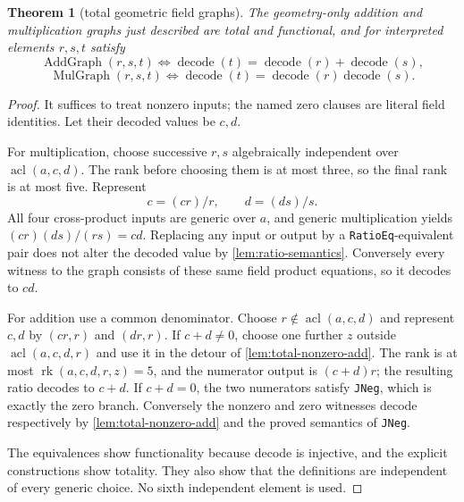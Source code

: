 \documentclass[11pt,oneside]{article}
\newtheorem{theorem}{Theorem}[section]
\theoremstyle{definition}
\theoremstyle{remark}
\newcommand{\acl}{\operatorname{acl}}
\newcommand{\rk}{\operatorname{rk}}
\newcommand{\lean}[1]{\nolinkurl{#1}}
\begin{document}
\begin{theorem}[total geometric field graphs]\label{thm:total-field-graphs}
The geometry-only addition and multiplication graphs just described are total and
functional, and for interpreted elements $r,s,t$ satisfy
\[
 \operatorname{AddGraph}(r,s,t)\Longleftrightarrow
   \operatorname{decode}(t)=\operatorname{decode}(r)+\operatorname{decode}(s),
\]
\[
 \operatorname{MulGraph}(r,s,t)\Longleftrightarrow
   \operatorname{decode}(t)=\operatorname{decode}(r)\operatorname{decode}(s).
\]
\end{theorem}
\begin{proof}
It suffices to treat nonzero inputs; the named zero clauses are literal field identities.
Let their decoded values be $c,d$.

For multiplication, choose successive $r,s$ algebraically independent over
$\acl(a,c,d)$.  The rank before choosing them is at most three, so the final rank is at
most five.  Represent
\[
 c=(cr)/r,\qquad d=(ds)/s.
\]
All four cross-product inputs are generic over $a$, and generic multiplication yields
$(cr)(ds)/(rs)=cd$.  Replacing any input or output by a \lean{RatioEq}-equivalent pair
does not alter the decoded value by \cref{lem:ratio-semantics}.  Conversely every witness
to the graph consists of these same field product equations, so it decodes to $cd$.

For addition use a common denominator.  Choose
$r\notin\acl(a,c,d)$ and represent $c,d$ by $(cr,r)$ and $(dr,r)$.  If $c+d\neq0$, choose
one further $z$ outside $\acl(a,c,d,r)$ and use it in the detour of
\cref{lem:total-nonzero-add}.  The rank is at most
$\rk(a,c,d,r,z)=5$, and the numerator output is $(c+d)r$; the resulting ratio decodes to
$c+d$.  If $c+d=0$, the two numerators satisfy \lean{JNeg}, which is exactly the zero
branch.  Conversely the nonzero and zero witnesses decode respectively by
\cref{lem:total-nonzero-add} and the proved semantics of \lean{JNeg}.

The equivalences show functionality because decode is injective, and the explicit
constructions show totality.  They also show that the definitions are independent of every
generic choice.  No sixth independent element is used.
\end{proof}
\end{document}
